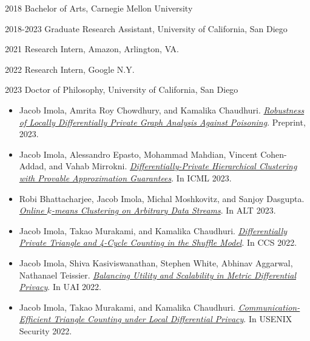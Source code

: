 \documentclass[12pt]{ucsddissertation}
\begin{document}
\begin{vita}
\noindent
\begin{cv}{}
\begin{cvlist}{}
\item[2018] Bachelor of Arts, Carnegie Mellon University
\item[2018-2023] Graduate Research Assistant, University of California, San
Diego
\item[2021] Research Intern, Amazon, Arlington, VA.
\item[2022] Research Intern, Google N.Y.
\item[2023] Doctor of Philosophy, University of California, San Diego
\end{cvlist}
\end{cv}

\publications
\begin{itemize}
\item
		Jacob Imola, Amrita Roy Chowdhury, and Kamalika Chaudhuri.
		\textit{\href{https://arxiv.org/pdf/2210.14376.pdf}{Robustness of Locally Differentially Private Graph Analysis Against Poisoning}}. Preprint, 2023.

\item
	Jacob Imola, Alessandro Epasto, Mohammad Mahdian, Vincent Cohen-Addad, and Vahab Mirrokni.
	\textit{\href{https://arxiv.org/abs/2302.00037}{Differentially-Private Hierarchical Clustering with Provable Approximation Guarantees}}. In ICML 2023.

\item
		Robi Bhattacharjee, Jacob Imola, Michal Moshkovitz, and Sanjoy Dasgupta.
		\textit{\href{https://arxiv.org/abs/2102.09101}{Online $k$-means Clustering on Arbitrary Data Streams}}. In ALT 2023.

\item
 Jacob Imola, Takao Murakami, and Kamalika Chaudhuri.
		\textit{\href{https://arxiv.org/abs/2205.01429.pdf}{Differentially Private Triangle and 4-Cycle Counting in the Shuffle Model}}. In CCS 2022.

\item Jacob Imola, Shiva Kasiviswanathan, Stephen White, Abhinav Aggarwal, Nathanael Teissier.
		\textit{\href{https://openreview.net/pdf?id=B0l8-wLjql5}{Balancing Utility and Scalability in Metric Differential Privacy}}. In UAI 2022.

\item Jacob Imola, Takao Murakami, and Kamalika Chaudhuri.
		\textit{\href{https://arxiv.org/abs/2110.06485}{Communication-Efficient Triangle Counting under Local Differential Privacy}}. In USENIX Security 2022.


\end{itemize}
\end{vita}
\end{document}
